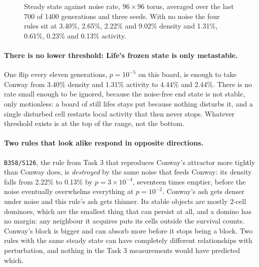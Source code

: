 \documentclass[11pt]{article}
\newcommand{\rulename}[1]{\texttt{#1}}
\begin{document}
\begin{figure}[h]
\caption{Steady state against noise rate, $96\times96$ torus, averaged over the last 700 of 1400
generations and three seeds. With no noise the four rules sit at 3.40\%, 2.65\%, 2.22\% and 9.02\%
density and 1.31\%, 0.61\%, 0.23\% and 0.13\% activity.}
\end{figure}

\paragraph{There is no lower threshold: Life's frozen state is only metastable.} One flip every
eleven generations, $p=10^{-5}$ on this board, is enough to take Conway from 3.40\% density and
1.31\% activity to 4.44\% and 2.44\%. There is no rate small enough to be ignored, because the
noise-free end state is not stable, only motionless: a board of still lifes stays put because nothing
disturbs it, and a single disturbed cell restarts local activity that then never stops. Whatever
threshold exists is at the top of the range, not the bottom.

\paragraph{Two rules that look alike respond in opposite directions.} \rulename{B358/S126}, the rule
from Task 3 that reproduces Conway's attractor more tightly than Conway does, is \emph{destroyed} by
the same noise that feeds Conway: its density falls from 2.22\% to 0.13\% by $p=3\times10^{-4}$,
seventeen times emptier, before the noise eventually overwhelms everything at $p=10^{-2}$. Conway's
ash gets denser under noise and this rule's ash gets thinner. Its stable objects are mostly 2-cell
dominoes, which are the smallest thing that can persist at all, and a domino has no margin: any
neighbour it acquires puts its cells outside the survival counts. Conway's block is bigger and can
absorb more before it stops being a block. Two rules with the same steady state can have completely
different relationships with perturbation, and nothing in the Task 3 measurements would have
predicted which.
\end{document}
